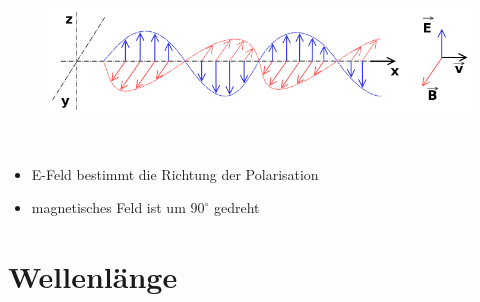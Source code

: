 \begin{frame}
\begin{center}
\begin{minipage}{0.45\textwidth}
	    \end{minipage}
        \begin{minipage}{0.45\textwidth}
          \begin{figure}
            \includegraphics[width=\textwidth,height=.8\textheight,keepaspectratio]{e08/Onde_electromagnetique.png}\\
          \end{figure}
        \end{minipage}\\[1.5em]

	    \begin{itemize}
	    	\item E-Feld bestimmt die Richtung der Polarisation 
	    	\item magnetisches Feld ist um $90^\circ$ gedreht
	    \end{itemize}
    
    \end{center}

\end{frame}

\section*{Wellenlänge}

